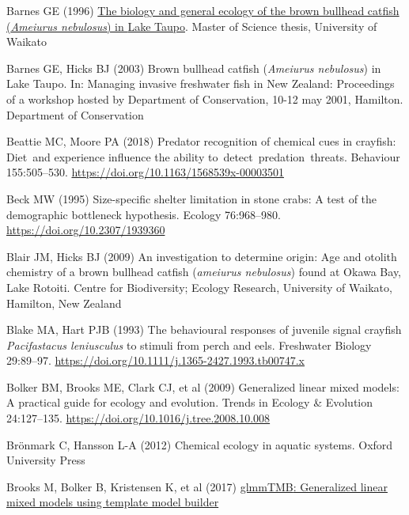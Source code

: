 \documentclass[
  12pt,
  a4paper,
]{scrbook}
\newlength{\cslhangindent}
\newenvironment{CSLReferences}[2] %
 {\begin{list}{}{%
  \setlength{\itemindent}{0pt}
  \setlength{\leftmargin}{0pt}
  \setlength{\parsep}{0pt}
  \ifodd #1
   \setlength{\leftmargin}{\cslhangindent}
   \setlength{\itemindent}{-1\cslhangindent}
  \fi
  \setlength{\itemsep}{#2\baselineskip}}}
 {\end{list}}
\begin{document}
\begin{CSLReferences}{1}{1}
Barnes GE (1996)
\href{https://researchcommons.waikato.ac.nz/items/24cf02c1-8c2f-4b63-ba89-e8a509e9ba05}{The
biology and general ecology of the brown bullhead catfish
({\emph{Ameiurus nebulosus}}) in {Lake Taupo}}. Master of Science
thesis, University of Waikato

Barnes GE, Hicks BJ (2003) Brown bullhead catfish ({\emph{Ameiurus
nebulosus}}) in {Lake Taupo}. In: Managing invasive freshwater fish in
{New Zealand}: Proceedings of a workshop hosted by {Department of
Conservation}, 10-12 may 2001, {Hamilton}. Department of Conservation

Beattie MC, Moore PA (2018) Predator recognition of chemical cues in
crayfish: Diet~and experience influence the ability
to~detect~predation~threats. Behaviour 155:505--530.
\url{https://doi.org/10.1163/1568539x-00003501}

Beck MW (1995) Size-specific shelter limitation in stone crabs: A test
of the demographic bottleneck hypothesis. Ecology 76:968--980.
\url{https://doi.org/10.2307/1939360}

Blair JM, Hicks BJ (2009) An investigation to determine origin: Age and
otolith chemistry of a brown bullhead catfish (\emph{ameiurus
nebulosus}) found at {Okawa Bay, Lake Rotoiti}. Centre for Biodiversity;
Ecology Research, University of Waikato, Hamilton, New Zealand

Blake MA, Hart PJB (1993) The behavioural responses of juvenile signal
crayfish {\emph{Pacifastacus leniusculus}} to stimuli from perch and
eels. Freshwater Biology 29:89--97.
\url{https://doi.org/10.1111/j.1365-2427.1993.tb00747.x}

Bolker BM, Brooks ME, Clark CJ, et al (2009) Generalized linear mixed
models: A practical guide for ecology and evolution. Trends in Ecology
\& Evolution 24:127--135.
\url{https://doi.org/10.1016/j.tree.2008.10.008}

Brönmark C, Hansson L-A (2012) Chemical ecology in aquatic systems.
Oxford University Press

Brooks M, Bolker B, Kristensen K, et al (2017)
\href{https://doi.org/10.32614/cran.package.glmmtmb}{{glmmTMB}:
Generalized linear mixed models using template model builder}


\end{CSLReferences}
\end{document}
